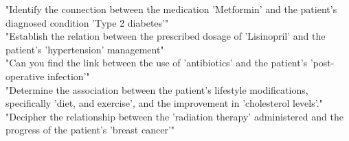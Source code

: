 "Identify the connection between the medication 'Metformin' and the patient's diagnosed condition 'Type 2 diabetes'"\\
"Establish the relation between the prescribed dosage of 'Lisinopril' and the patient's 'hypertension' management"\\
"Can you find the link between the use of 'antibiotics' and the patient's 'post-operative infection'"\\
"Determine the association between the patient's lifestyle modifications, specifically 'diet, and exercise', and the improvement in 'cholesterol levels'."\\
"Decipher the relationship between the 'radiation therapy' administered and the progress of the patient's 'breast cancer'"